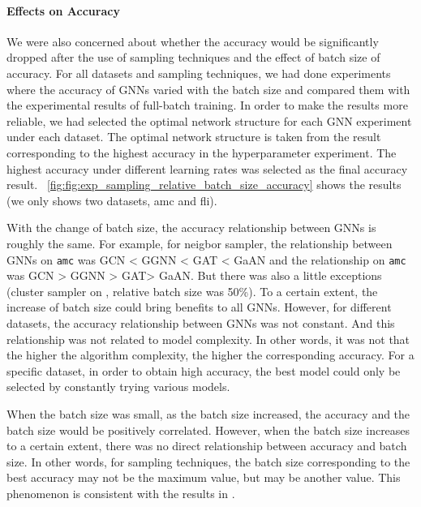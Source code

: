 \paragraph{Effects on Accuracy}
%
We were also concerned about whether the accuracy would be significantly dropped after the use of sampling techniques
and the effect of batch size of accuracy.
%
For all datasets and sampling techniques, we had done experiments where the accuracy of GNNs varied with the batch size
and compared them with the experimental results of full-batch training.
%
In order to make the results more reliable, we had selected the optimal network structure for each GNN experiment under each dataset.
%
The optimal network structure is taken from the result corresponding to the highest accuracy in the hyperparameter experiment.
%
The highest accuracy under different learning rates was selected as the final accuracy result.
%
\figurename~\ref{fig:fig:exp_sampling_relative_batch_size_accuracy} shows the results (we only shows two datasets, amc and fli).
%

%
With the change of batch size, the accuracy relationship between GNNs is roughly the same.
%
For example, for neigbor sampler, the relationship between GNNs on \texttt{amc} was GCN < GGNN < GAT < GaAN and the relationship on \texttt{amc} was GCN > GGNN > GAT> GaAN.
%
But there was also a little exceptions (cluster sampler on , relative batch size was 50\%).
%
To a certain extent, the increase of batch size could bring benefits to all GNNs.
%
However, for different datasets, the accuracy relationship between GNNs was not constant.
%
And this relationship was not related to model complexity.
%
In other words, it was not that the higher the algorithm complexity, the higher the corresponding accuracy.
%
For a specific dataset, in order to obtain high accuracy, the best model could only be selected by constantly trying various models.
%

When the batch size was small, as the batch size increased, the accuracy and the batch size would be positively correlated. 
%
However, when the batch size increases to a certain extent, there was no direct relationship between accuracy and batch size.
%
In other words, for sampling techniques, the batch size corresponding to the best accuracy may not be the maximum value, but may be another value. 
%
This phenomenon is consistent with the results in \cite{zeng2020_graphsaint}.

